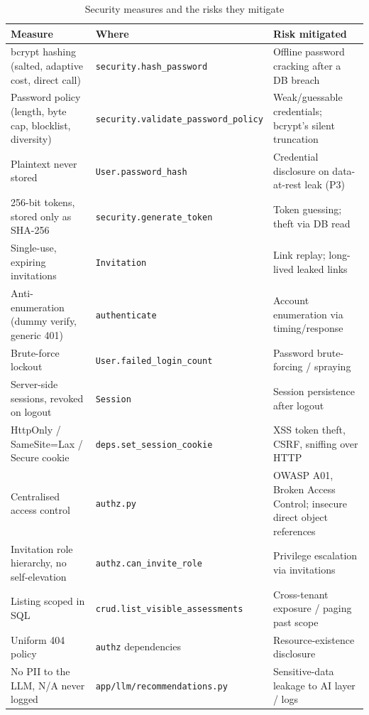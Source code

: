 \begin{table}[ht!]
  \centering
  \begin{tabular}{@{}p{3.6cm}p{4.4cm}p{4.6cm}@{}}
    \toprule
    Measure & Where & Risk mitigated \\
    \midrule
    bcrypt hashing (salted, adaptive cost, direct call) & \texttt{security.\allowbreak hash\_\allowbreak password} & Offline password cracking after a DB breach \\
    Password policy (length, byte cap, blocklist, diversity) & \texttt{security.\allowbreak validate\_\allowbreak password\_\allowbreak policy} & Weak/guessable credentials; bcrypt's silent truncation \\
    Plaintext never stored & \texttt{User.\allowbreak password\_\allowbreak hash} & Credential disclosure on data-at-rest leak (P3) \\
    256-bit tokens, stored only as SHA-256 & \texttt{security.\allowbreak generate\_\allowbreak token} & Token guessing; theft via DB read \\
    Single-use, expiring invitations & \texttt{Invitation} & Link replay; long-lived leaked links \\
    Anti-enumeration (dummy verify, generic 401) & \texttt{authenticate} & Account enumeration via timing/response \\
    Brute-force lockout & \texttt{User.\allowbreak failed\_\allowbreak login\_\allowbreak count} & Password brute-forcing / spraying \\
    Server-side sessions, revoked on logout & \texttt{Session} & Session persistence after logout \\
    HttpOnly / SameSite=Lax / Secure cookie & \texttt{deps.\allowbreak set\_\allowbreak session\_\allowbreak cookie} & XSS token theft, CSRF, sniffing over HTTP \\
    Centralised access control & \texttt{authz.\allowbreak py} & OWASP A01, Broken Access Control; insecure direct object references \\
    Invitation role hierarchy, no self-elevation & \texttt{authz.\allowbreak can\_\allowbreak invite\_\allowbreak role} & Privilege escalation via invitations \\
    Listing scoped in SQL & \texttt{crud.\allowbreak list\_\allowbreak visible\_\allowbreak assessments} & Cross-tenant exposure / paging past scope \\
    Uniform 404 policy & \texttt{authz} dependencies & Resource-existence disclosure \\
    No PII to the LLM, N/A never logged & \texttt{app/\allowbreak llm/\allowbreak recommendations.\allowbreak py} & Sensitive-data leakage to AI layer / logs \\
    \bottomrule
  \end{tabular}
  \caption{Security measures and the risks they mitigate}
  \label{tab:auth-owasp-measures}
\end{table}

